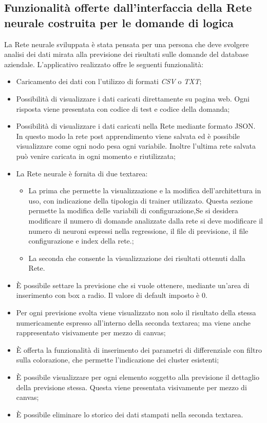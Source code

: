 \subsection{Funzionalit\`a offerte dall'interfaccia della Rete neurale costruita per le domande di logica}
\label{Funzionalita offerte dall'interfaccia della Rete neurale}
La Rete neurale sviluppata \`e stata pensata per una persona che deve svolgere analisi dei dati mirata alla previsione dei risultati sulle domande del database aziendale. L'applicativo realizzato offre le seguenti funzionalit\`a:
\begin{itemize}
\item Caricamento dei dati con l'utilizzo di formati \textit{CSV} o \textit{TXT};
\item Possibilit\`a di visualizzare i dati caricati direttamente su pagina web. Ogni risposta viene presentata con codice di test e codice della domanda;
\item Possibilit\`a di visualizzare i dati caricati nella Rete mediante formato JSON. In questo modo la rete post apprendimento viene salvata ed \`e possibile visualizzare come ogni nodo pesa ogni variabile. Inoltre l'ultima rete salvata pu\`o venire caricata in ogni momento e riutilizzata;
\item La Rete neurale \`e fornita di due textarea: 
\begin{itemize}
\item La prima che permette la visualizzazione e la modifica dell'architettura in uso, con indicazione della tipologia di trainer utilizzato. Questa sezione permette la modifica delle variabili di configurazione,Se si desidera modificare il numero di domande analizzate dalla rete si deve modificare il numero di neuroni espressi nella regressione, il file di previsione, il file configurazione e index della rete.;
\item La seconda che consente la visualizzazione dei risultati ottenuti dalla Rete.
\end{itemize}
\item \`E possibile settare la previsione che si vuole ottenere, mediante un'area di inserimento con box a radio. Il valore di default imposto \`e 0. 
\item Per ogni previsione svolta viene visualizzato non solo il risultato della stessa numericamente espresso all'interno della seconda textarea; ma viene anche rappresentato visivamente per mezzo di canvas;
\item \`E offerta la funzionalit\`a di inserimento dei parametri di differenziale con filtro sulla colorazione, che permette l'indicazione dei cluster esistenti;
\item \`E possibile visualizzare per ogni elemento soggetto alla previsione il dettaglio della previsione stessa. Questa viene presentata visivamente per mezzo di canvas;
\item \`E possibile eliminare lo storico dei dati stampati nella seconda textarea.
\end{itemize}


